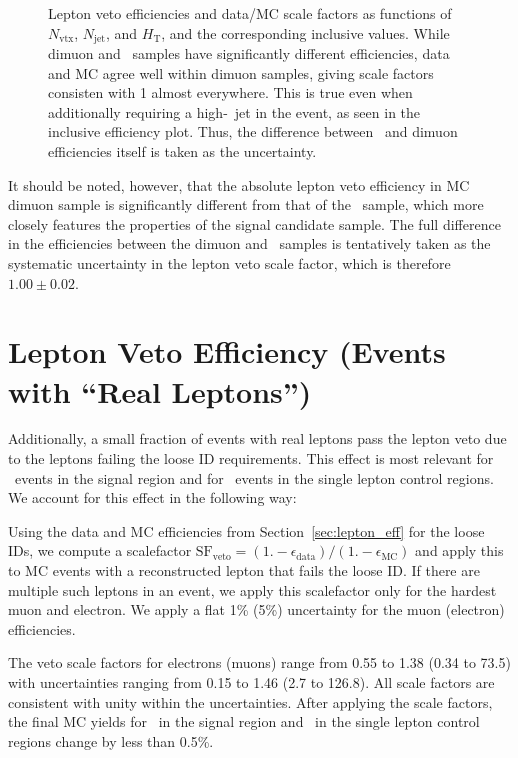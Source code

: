 \begin{figure}[tbph]
  \caption{
    Lepton veto efficiencies and data/MC scale factors as functions of $N_{\text{vtx}}$, $N_{\text{jet}}$, and $H_{\mathrm{T}}$, and the corresponding inclusive values. 
    While dimuon and \zinvg\ samples have significantly different efficiencies, data and MC agree well within dimuon samples, giving scale factors consisten with 1 almost everywhere. 
    This is true even when additionally requiring a high-\pt\ jet in the event, as seen in the inclusive efficiency plot. 
    Thus, the difference between \zinvg\ and dimuon efficiencies itself is taken as the uncertainty.
  }
 \label{fig:leptonveto_efficiencies}
\end{figure}

It should be noted, however, that the absolute lepton veto efficiency in MC dimuon sample is significantly different from that of the \zinvg\ sample, which more closely features the properties of the signal candidate sample. 
The full difference in the efficiencies between the dimuon and \zinvg\ samples is tentatively taken as the systematic uncertainty in the lepton veto scale factor, which is therefore $1.00 \pm 0.02$.

\section{Lepton Veto Efficiency (Events with ``Real Leptons'')}
\label{sec:real_lepton_veto}
Additionally, a small fraction of events with real leptons pass the lepton veto due to the leptons failing the loose ID requirements. 
This effect is most relevant for \wlng\ events in the signal region and for \zllg\ events in the single lepton control regions. 
We account for this effect in the following way:

Using the data and MC efficiencies from Section~\ref{sec:lepton_eff} for the loose IDs, we compute a scalefactor $\text{SF}_{\text{veto}} = (1. - \epsilon_{\text{data}}) / (1. - \epsilon_{\text{MC}})$ and apply  this to MC events with a reconstructed lepton that fails the loose ID. 
If there are multiple such  leptons in an event, we apply this scalefactor only for the hardest muon and electron. 
We apply a flat 1\% (5\%) uncertainty for the muon (electron) efficiencies. 

The veto scale factors for electrons (muons) range from 0.55 to 1.38 (0.34 to 73.5) with uncertainties  ranging from 0.15 to 1.46 (2.7 to 126.8). 
All scale factors are consistent with unity within the uncertainties. 
After applying the scale factors, the final MC yields for \wlng\ in the signal  region and \zllg\ in the single lepton control regions change by less than 0.5\%.
